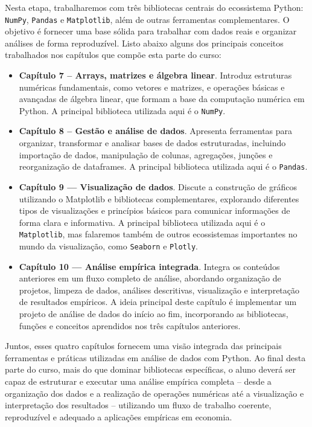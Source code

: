 \documentclass[
  brazilian,
  letterpaper,
  DIV=11,
  numbers=noendperiod]{scrreprt}
\begin{document}
Nesta etapa, trabalharemos com três bibliotecas centrais do ecossistema
Python: \texttt{NumPy}, \texttt{Pandas} e \texttt{Matplotlib}, além de
outras ferramentas complementares. O objetivo é fornecer uma base sólida
para trabalhar com dados reais e organizar análises de forma
reproduzível. Listo abaixo alguns dos principais conceitos trabalhados
nos capítulos que compõe esta parte do curso:

\begin{itemize}
\item
  \textbf{Capítulo 7 -- Arrays, matrizes e álgebra linear}. Introduz
  estruturas numéricas fundamentais, como vetores e matrizes, e
  operações básicas e avançadas de álgebra linear, que formam a base da
  computação numérica em Python. A principal biblioteca utilizada aqui é
  o \texttt{NumPy}.
\item
  \textbf{Capítulo 8 -- Gestão e análise de dados}. Apresenta
  ferramentas para organizar, transformar e analisar bases de dados
  estruturadas, incluindo importação de dados, manipulação de colunas,
  agregações, junções e reorganização de dataframes. A principal
  biblioteca utilizada aqui é o \texttt{Pandas}.
\item
  \textbf{Capítulo 9 --- Visualização de dados}. Discute a construção de
  gráficos utilizando o Matplotlib e bibliotecas complementares,
  explorando diferentes tipos de visualizações e princípios básicos para
  comunicar informações de forma clara e informativa. A principal
  biblioteca utilizada aqui é o \texttt{Matplotlib}, mas falaremos
  também de outros ecossistemas importantes no mundo da visualização,
  como \texttt{Seaborn} e \texttt{Plotly}.
\item
  \textbf{Capítulo 10 --- Análise empírica integrada}. Integra os
  conteúdos anteriores em um fluxo completo de análise, abordando
  organização de projetos, limpeza de dados, análises descritivas,
  visualização e interpretação de resultados empíricos. A ideia
  principal deste capítulo é implementar um projeto de análise de dados
  do início ao fim, incorporando as bibliotecas, funções e conceitos
  aprendidos nos três capítulos anteriores.
\end{itemize}

Juntos, esses quatro capítulos fornecem uma visão integrada das
principais ferramentas e práticas utilizadas em análise de dados com
Python. Ao final desta parte do curso, mais do que dominar bibliotecas
específicas, o aluno deverá ser capaz de estruturar e executar uma
análise empírica completa -- desde a organização dos dados e a
realização de operações numéricas até a visualização e interpretação dos
resultados -- utilizando um fluxo de trabalho coerente, reproduzível e
adequado a aplicações empíricas em economia.
\end{document}
